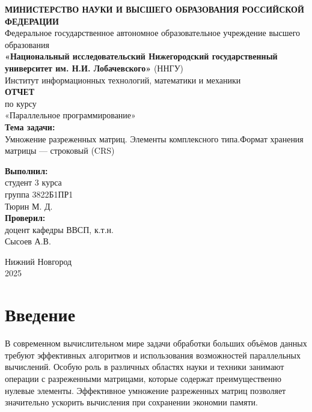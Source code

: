\documentclass[a4paper,12pt]{article}
\begin{document}
\begin{titlepage}
\begin{center}

\onehalfspacing

\textbf{МИНИСТЕРСТВО НАУКИ И ВЫСШЕГО ОБРАЗОВАНИЯ РОССИЙСКОЙ ФЕДЕРАЦИИ} \\[0.3cm]
Федеральное государственное автономное образовательное учреждение высшего образования \\[0.3cm]
\textbf{«Национальный исследовательский Нижегородский государственный университет им. Н.И. Лобачевского»} (ННГУ) \\[0.3cm]
Институт информационных технологий, математики и механики \\[2cm]

{\Large \textbf{ОТЧЕТ}} \\[0.5cm]
по курсу \\[0.3cm]
{\large «Параллельное программирование»} \\[1cm]

\textbf{Тема задачи:} \\[0.3cm]
{\large Умножение разреженных матриц. Элементы комплексного типа.Формат хранения матрицы — строковый (CRS)} \\

\vfill
\begin{flushright}
\textbf{Выполнил:} \\
студент 3 курса \\
группа 3822Б1ПР1 \\
Тюрин М. Д. \\[1cm]

\textbf{Проверил:} \\
доцент кафедры ВВСП, к.т.н. \\ 
Сысоев А.В.
\end{flushright}

\vfill

Нижний Новгород \\
2025

\end{center}
\end{titlepage}

\newpage

\onehalfspacing

\section{Введение}

В современном вычислительном мире задачи обработки больших объёмов данных требуют эффективных алгоритмов и использования возможностей параллельных вычислений. Особую роль в различных областях науки и техники занимают операции с разреженными матрицами, которые содержат преимущественно нулевые элементы. 
Эффективное умножение разреженных матриц позволяет  значительно ускорить вычисления при сохранении экономии памяти.
\end{document}
